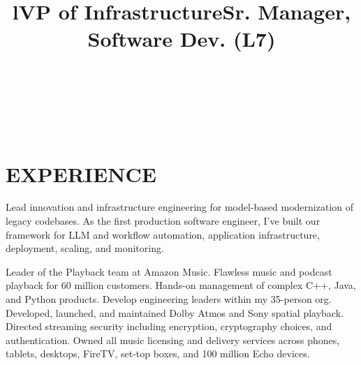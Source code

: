 \documentclass[margin]{res}
\begin{document}
\bigskip

\address{2528 Chilton Way\\ken@hero.net}
\address{Berkeley, CA 94704\\(310) 383-7981}

\begin{resume}

\begin{format}
\title{l}\\
\\
\body\\
\end{format}

\section{EXPERIENCE}

\title{\textbf{VP of Infrastructure}}
\begin{position}
\hspace*{.5cm}Lead innovation and infrastructure engineering for model-based modernization of legacy codebases. As the first production software engineer, I've built our framework for LLM and workflow automation, application infrastructure, deployment, scaling, and monitoring.
\end{position}
\title{\textbf{Sr. Manager, Software Dev. (L7)}}
\begin{position}
\hspace*{.25cm}Leader of the Playback team at Amazon Music. Flawless music and podcast playback for 60 million customers. Hands-on management of complex C++, Java, and Python products. Develop engineering leaders within my 35-person org. Developed, launched, and maintained Dolby Atmos and Sony spatial playback. Directed streaming security including encryption, cryptography choices, and authentication. Owned all music licensing and delivery services across phones, tablets, desktops, FireTV, set-top boxes, and 100 million Echo devices. 
\end{position}


\end{resume}
\end{document}
